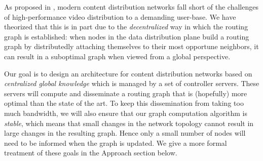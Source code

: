 As proposed in \cite{Liu:2012:CCI:2342356.2342431}, modern content distribution networks fall short of the challenges of high-performance video distribution to a demanding user-base. We have theorized that this is in part due to the {\em decentralized} way in which the routing graph is established: when nodes in the data distribution plane build a routing graph by distributedly attaching themselves to their most opportune neighbors, it can result in a suboptimal graph when viewed from a global perspective.

Our goal is to design an architecture for content distribution networks based on {\em centralized global knowledge} which is managed by a set of controller servers. These servers will compute and disseminate a routing graph that is (hopefully) more optimal than the state of the art.
To keep this dissemination from taking too much bandwidth, we will also ensure that our graph computation algorithm is {\em stable}, which means that small changes in the network topology cannot result in large changes in the resulting graph.
Hence only a small number of nodes will need to be informed when the graph is updated.
We give a more formal treatment of these goals in the Approach section below.
